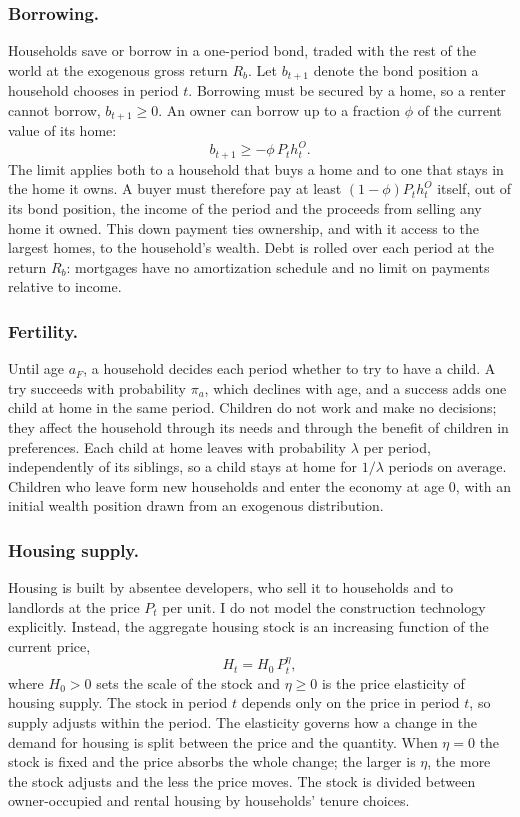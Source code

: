 \subsubsection*{Borrowing.}
Households save or borrow in a one-period bond, traded with the rest of the
world at the exogenous gross return $R_b$. Let $b_{t+1}$ denote the bond
position a household chooses in period $t$.
Borrowing must be secured by a home, so a renter cannot borrow,
$b_{t+1}\ge0$. An owner can borrow up to a fraction $\phi$ of the current
value of its home:
\begin{equation}
 b_{t+1}\ge-\phi\,P_th^O_t .
 \label{eq:m-ltv}
\end{equation}
The limit applies both to a household that buys a home and to one that stays
in the home it owns. A buyer must therefore pay at least $(1-\phi)P_th^O_t$
itself, out of its bond position, the income of the period and the proceeds
from selling any home it owned. This down payment ties ownership, and with it
access to the largest homes, to the household's wealth. Debt is rolled over
each period at the return $R_b$: mortgages have no amortization schedule and
no limit on payments relative to income.

\subsubsection*{Fertility.}
Until age $a_F$, a household decides each period whether to try to have a
child. A try succeeds with probability $\pi_a$, which declines with age, and a
success adds one child at home in the same period. Children do not work and
make no decisions; they affect the household through its needs and through
the benefit of children in preferences. Each child at home leaves with
probability $\lambda$ per period, independently of its siblings, so a child
stays at home for $1/\lambda$ periods on average. Children who leave form new
households and enter the economy at age $0$, with an initial wealth position
drawn from an exogenous distribution.

\subsubsection*{Housing supply.}
Housing is built by absentee developers, who sell it to households and to
landlords at the price $P_t$ per unit. I do not model the construction
technology explicitly. Instead, the aggregate housing stock is an increasing
function of the current price,
\begin{equation}
 H_t=H_0\,P_t^{\eta},
 \label{eq:m-supply}
\end{equation}
where $H_0>0$ sets the scale of the stock and $\eta\ge0$ is the price
elasticity of housing supply. The stock in period $t$ depends only on the
price in period $t$, so supply adjusts within the period. The elasticity
governs how a change in the demand for housing is split between the price and
the quantity. When $\eta=0$ the stock is fixed and the price absorbs the whole
change; the larger is $\eta$, the more the stock adjusts and the less the
price moves. The stock is divided between owner-occupied and rental housing
by households' tenure choices.

